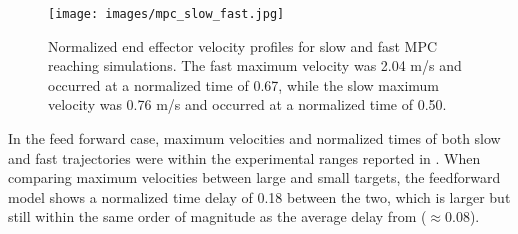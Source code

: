 \documentclass[letterpaper, 10pt, conference]{ieeeconf}
\newcommand{\todo}[1]{\textcolor{red}{\textbf{TODO:} #1}}
\begin{document}
\begin{figure}[h]
    \centering
    \texttt{[image: images/mpc\_slow\_fast.jpg]}
    \caption{Normalized end effector velocity profiles for slow and fast MPC reaching simulations. The fast maximum velocity was 2.04 m/s and occurred at a normalized time of 0.67, while the slow maximum velocity was 0.76 m/s and occurred at a normalized time of 0.50.}
    \label{fig:VelocityMPC}
\end{figure}

In the feed forward case, maximum velocities and normalized times of both slow and fast trajectories were within the experimental ranges reported in \cite{soechting_target_size}.
When comparing maximum velocities between large and small targets, the feedforward model shows a normalized time delay of 0.18 between the two, which is larger but still within the same order of magnitude as the average delay from \cite{soechting_target_size} ($\approx 0.08$). 
\end{document}
